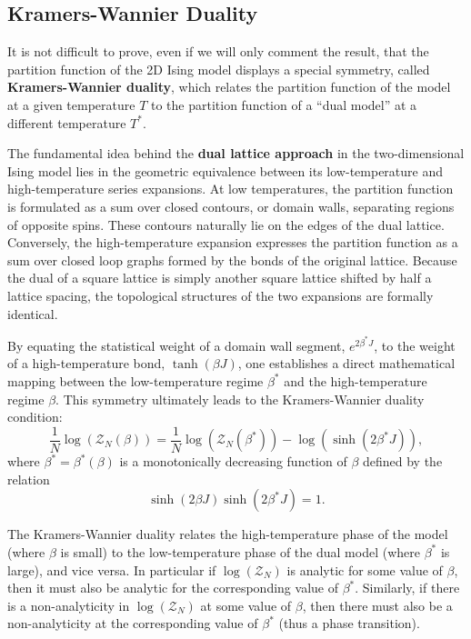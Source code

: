 \subsection{Kramers-Wannier Duality}

It is not difficult to prove, even if we will only comment the result, that the partition function of the 2D Ising model displays a special symmetry, called \textbf{Kramers-Wannier duality}, which relates the partition function of the model at a given temperature \(T\) to the partition function of a ``dual model'' at a different temperature \(T^*\).

The fundamental idea behind the \textbf{dual lattice approach} in the two-dimensional Ising model lies in the geometric equivalence between its low-temperature and high-temperature series expansions. At low temperatures, the partition function is formulated as a sum over closed contours, or domain walls, separating regions of opposite spins. These contours naturally lie on the edges of the dual lattice. Conversely, the high-temperature expansion expresses the partition function as a sum over closed loop graphs formed by the bonds of the original lattice. Because the dual of a square lattice is simply another square lattice shifted by half a lattice spacing, the topological structures of the two expansions are formally identical.

By equating the statistical weight of a domain wall segment, \(e^{2 \beta^* J}\), to the weight of a high-temperature bond, \(\tanh(\beta J)\), one establishes a direct mathematical mapping between the low-temperature regime \(\beta^*\) and the high-temperature regime \(\beta\). This symmetry ultimately leads to the Kramers-Wannier duality condition:
\[
  \frac{1}{N} \log(\mathcal{Z}_N(\beta)) = \frac{1}{N} \log(\mathcal{Z}_N(\beta^*)) - \log(\sinh(2 \beta^* J)),
\]
where \(\beta^* = \beta^*(\beta)\) is a monotonically decreasing function of \(\beta\) defined by the relation
\[
  \sinh(2 \beta J) \sinh(2 \beta^* J) = 1.
\]

The Kramers-Wannier duality relates the high-temperature phase of the model (where \(\beta\) is small) to the low-temperature phase of the dual model (where \(\beta^*\) is large), and vice versa. In particular if \(\log(\mathcal{Z}_N)\) is analytic for some value of \(\beta\), then it must also be analytic for the corresponding value of \(\beta^*\). Similarly, if there is a non-analyticity in \(\log(\mathcal{Z}_N)\) at some value of \(\beta\), then there must also be a non-analyticity at the corresponding value of \(\beta^*\) (thus a phase transition).

